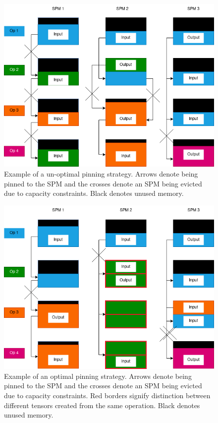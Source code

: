 \begin{figure}[th]
\centering
\includegraphics[scale=0.7]{Figures/reuse_example_pin_map_fail_1.png}
\decoRule
\caption[pin_naive]{Example of a un-optimal pinning strategy. Arrows
denote being pinned to the SPM and the crosses denote
an SPM being evicted due to capacity constraints.
Black denotes unused memory.}
\label{fig:pin_naive}
\end{figure}


\begin{figure}[th]
\centering
\includegraphics[scale=0.7]{Figures/reuse_example_pin_all.png}
\decoRule
\caption[pin_optimal]{Example of an optimal pinning strategy. Arrows
denote being pinned to the SPM and the crosses denote
an SPM being evicted due to capacity constraints. Red borders signify
distinction between different tensors created from the same operation.
Black denotes unused memory.}
\label{fig:pin_optimal}
\end{figure}

